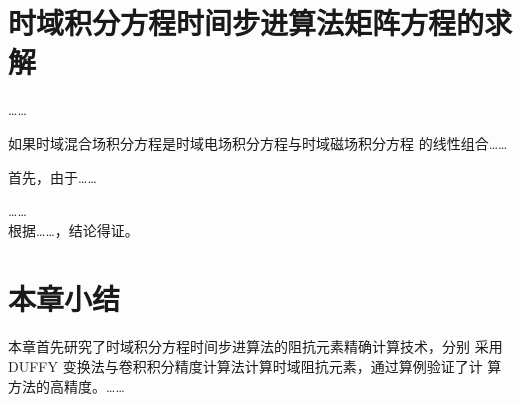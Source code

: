 \section{时域积分方程时间步进算法矩阵方程的求解}
……

\begin{dingli}
如果时域混合场积分方程是时域电场积分方程与时域磁场积分方程
的线性组合……
\end{dingli}
\begin{zhengming}
首先，由于……

……\\
根据……，结论得证。
\end{zhengming}
\section{本章小结}
本章首先研究了时域积分方程时间步进算法的阻抗元素精确计算技术，分别
采用DUFFY 变换法与卷积积分精度计算法计算时域阻抗元素，通过算例验证了计
算方法的高精度。……
